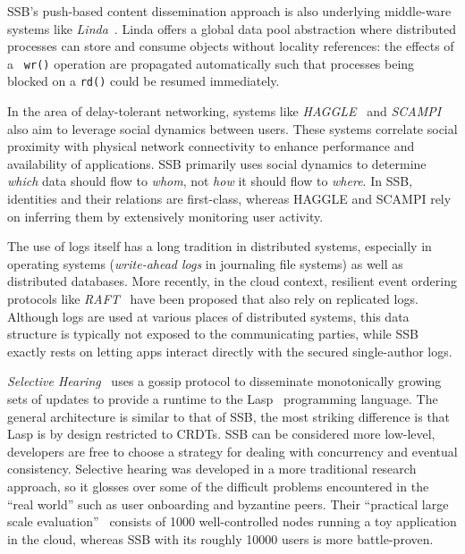 \documentclass[9pt,sigconf]{acmart}
\begin{document}
SSB's push-based content dissemination approach is also underlying
middle-ware systems like {\em
  Linda}~\cite{Gelernter:1985:GCL:2363.2433}. Linda offers a global
data pool abstraction where distributed processes can store and
consume objects without locality references: the effects of a {\tt
  wr()} operation are propagated automatically such that processes
being blocked on a {\tt rd()} could be resumed immediately.

In the area of delay-tolerant networking, systems like {\em
  HAGGLE}~\cite{scott2006haggle} and {\em
  SCAMPI}~\cite{pitkanen2012scampi} also aim to leverage social
dynamics between users. These systems correlate social proximity with
physical network connectivity to enhance performance and availability
of applications. SSB primarily uses social dynamics to determine {\em
  which} data should flow to {\em whom}, not {\em how} it should flow
to {\em where}. In SSB, identities and their relations are
first-class, whereas HAGGLE and SCAMPI rely on inferring them by
extensively monitoring user activity.

The use of logs itself has a long tradition in distributed systems,
especially in operating systems (\textit{write-ahead logs} in
journaling file systems) as well as distributed databases. More
recently, in the cloud context, resilient event ordering protocols
like {\em RAFT}~\cite{DBLP:conf/usenix/OngaroO14} have been proposed
that also rely on replicated logs. Although logs are used at various
places of distributed systems, this data structure is typically not
exposed to the communicating parties, while SSB exactly rests on
letting apps interact directly with the secured single-author logs.

\textit{Selective Hearing}~\cite{meiklejohn2015selective} uses a
gossip protocol to disseminate monotonically growing sets of updates
to provide a runtime to the Lasp~\cite{meiklejohn2015lasp} programming
language. The general architecture is similar to that of SSB, the most
striking difference is that Lasp is by design restricted to CRDTs. SSB
can be considered more low-level, developers are free to choose a
strategy for dealing with concurrency and eventual
consistency. Selective hearing was developed in a more traditional
research approach, so it glosses over some of the difficult problems
encountered in the ``real world'' such as user onboarding and
byzantine peers. Their ``practical large scale
evaluation''~\cite{meiklejohn2017lasp} consists of 1000
well-controlled nodes running a toy application in the cloud, whereas
SSB with its roughly 10000 users is more battle-proven.
\end{document}
